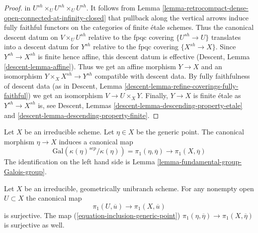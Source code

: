 \begin{proof}
in $U^{sh} \times_U U^{sh} \times_U U^{sh}$. It follows from
Lemma \ref{lemma-retrocompact-dense-open-connected-at-infinity-closed}
that pullback along the vertical arrows induce fully faithful functors on
the categories of finite \'etale schemes. Thus the
canonical descent datum on $V \times_U U^{sh}$ relative to
the fpqc covering $\{U^{sh} \to U\}$ translates into a
descent datum for $Y^{sh}$ relative to the fpqc covering $\{X^{sh} \to X\}$.
Since $Y^{sh} \to X^{sh}$ is finite hence affine, this descent datum is
effective (Descent, Lemma \ref{descent-lemma-affine}).
Thus we get an affine morphism $Y \to X$ and an isomorphism
$Y \times_X X^{sh} \to Y^{sh}$ compatible with descent data.
By fully faithfulness of descent data
(as in Descent, Lemma \ref{descent-lemma-refine-coverings-fully-faithful})
we get an isomorphism $V \to U \times_X Y$.
Finally, $Y \to X$ is finite \'etale as $Y^{sh} \to X^{sh}$ is, see
Descent, Lemmas \ref{descent-lemma-descending-property-etale} and
\ref{descent-lemma-descending-property-finite}.
\end{proof}

\noindent
Let $X$ be an irreducible scheme. Let $\eta \in X$ be the generic
point. The canonical morphism $\eta \to X$ induces a canonical map
\begin{equation}
\label{equation-inclusion-generic-point}
\text{Gal}(\kappa(\eta)^{sep}/\kappa(\eta)) = \pi_1(\eta, \overline{\eta})
\longrightarrow \pi_1(X, \overline{\eta})
\end{equation}
The identification on the left hand side is
Lemma \ref{lemma-fundamental-group-Galois-group}.

\begin{lemma}
\label{lemma-irreducible-geometrically-unibranch}
Let $X$ be an irreducible, geometrically unibranch scheme.
For any nonempty open $U \subset X$ the canonical map
$$
\pi_1(U, \overline{u}) \longrightarrow \pi_1(X, \overline{u})
$$
is surjective. The map (\ref{equation-inclusion-generic-point})
$\pi_1(\eta, \overline{\eta}) \to \pi_1(X, \overline{\eta})$
is surjective as well.
\end{lemma}

